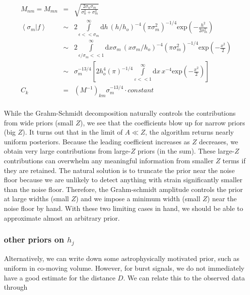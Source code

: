 \documentclass[10pt]{article}
\begin{document}
\begin{eqnarray}
M_{nm} = M_{mn} & = & \sqrt{\frac{2\sigma_n\sigma_m}{\sigma_n^2+\sigma_m^2}} \\
\left<\sigma_m|f\right> & \sim & 2\int\limits_{\epsilon << \sigma_m}^{\infty}\mathrm{d}h\, \left(h/h_o\right)^{-4} \left(\pi \sigma_m^2\right)^{-1/4} \mathrm{exp}\left(-\frac{h^2}{2\sigma_m^2} \right) \\
                        & \sim & 2\int\limits_{\epsilon/\sigma_m << 1}^{\infty}\mathrm{d}x\sigma_m\, \left(x\sigma_m/h_o\right)^{-4} \left(\pi \sigma_m^2\right)^{-1/4} \mathrm{exp}\left(-\frac{x^2}{2} \right) \\
                        & \sim & \sigma_m^{-13/4} \left[ 2 h_o^{4}(\pi)^{-1/4}\int\limits_{\varepsilon << 1}^{\infty}\mathrm{d}x\, x^{-4} \mathrm{exp}\left(-\frac{x^2}{2} \right) \right]\\
C_k & = & \left(M^{-1}\right)_{km} \sigma_m^{-13/4}\cdot constant\\
\end{eqnarray}

While the Grahm-Schmidt decomposition naturally controls the contributions from wide priors (small $Z$), we see that the coefficients blow up for narrow priors (big $Z$). It turns out that in the limit of $A\ll Z$, the algorithm returns nearly uniform posteriors. Because the leading coefficient increases as $Z$ decreases, we obtain very large contributions from large-$Z$ priors (in the sum). These large-$Z$ contributions can overwhelm any meaningful information from smaller $Z$ terms if they are retained. The natural solution is to truncate the prior near the noise floor because we are unlikely to detect anything with strain significantly smaller than the noise floor. Therefore, the Grahm-schmidt amplitude controls the prior at large widths (small $Z$) and we impose a minimum width (small $Z$) near the noise floor by hand. With these two limiting cases in hand, we should be able to approximate almost an arbitrary prior.

\subsubsection{other priors on $h_j$}

Alternatively, we can write down some astrophysically motivated prior, such as uniform in co-moving volume. However, for burst signals, we do not immediately have a good estimate for the distance $D$. We can relate this to the observed data through
\end{document}
